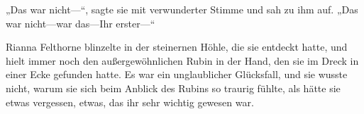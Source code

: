 „Das war nicht—“, sagte sie mit verwunderter Stimme und sah zu ihm auf. „Das war nicht—war das—Ihr erster—“

Rianna Felthorne blinzelte in der steinernen Höhle, die sie entdeckt hatte, und hielt immer noch den außergewöhnlichen Rubin in der Hand, den sie im Dreck in einer Ecke gefunden hatte. Es war ein unglaublicher Glücksfall, und sie wusste nicht, warum sie sich beim Anblick des Rubins so traurig fühlte, als hätte sie etwas vergessen, etwas, das ihr sehr wichtig gewesen war.

